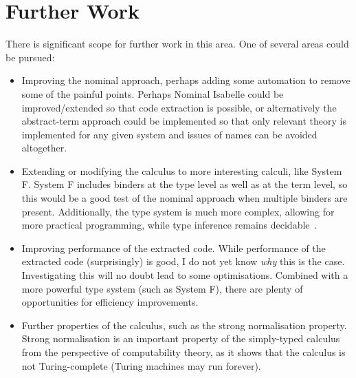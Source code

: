 \section{Further Work}
There is significant scope for further work in this area.
One of several areas could be pursued:
\begin{itemize}
\item
Improving the nominal approach, perhaps adding some automation to remove some of the painful points.
Perhaps Nominal Isabelle could be improved/extended so that code extraction is possible, or alternatively the abstract-term approach could be implemented so that only relevant theory is implemented for any given system and issues of names can be avoided altogether.
\item
Extending or modifying the calculus to more interesting calculi, like System F.
System F includes binders at the type level as well as at the term level, so this would be a good test of the nominal approach when multiple binders are present.
Additionally, the type system is much more complex, allowing for more practical programming, while type inference remains decidable~\cite{hindley-milner}.
\item
Improving performance of the extracted code.
While performance of the extracted code (surprisingly) is good, I do not yet know \emph{why} this is the case.
Investigating this will no doubt lead to some optimisations.
Combined with a more powerful type system (such as System F), there are plenty of opportunities for efficiency improvements.
\item
Further properties of the calculus, such as the strong normalisation property.
Strong normalisation is an important property of the simply-typed calculus from the perspective of computability theory, as it shows that the calculus is not Turing-complete (Turing machines may run forever).
\end{itemize}
